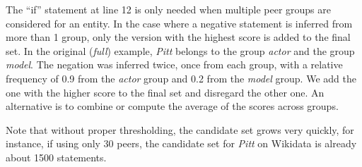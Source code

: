 \begin{example}
The ``if'' statement at line 12 is only needed when multiple peer groups are considered for an entity. In the case where a negative statement is inferred from more than 1 group, only the version with the highest score is added to the final set. In the original (\textit{full}) example, \textit{Pitt} belongs to the group \textit{actor} and the group \textit{model}. The negation  was inferred twice, once from each group, with a relative frequency of 0.9 from the \textit{actor} group and 0.2 from the \textit{model} group. We add the one with the higher score to the final set and disregard the other one. An alternative is to combine or compute the average of the scores across groups.

Note that without proper thresholding, the candidate set grows very quickly, for instance, if using only 30 peers, the candidate set for \textit{Pitt} on Wikidata is already about 1500 statements.
\end{example}\\

\begin{table*}
  \caption{Discovering candidate statements for \textit{Brad Pitt} from one peer group with 3 peers.}
  \label{tab:brad}
\end{table*}

